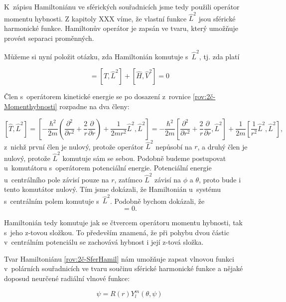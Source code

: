 K~zápisu Hamiltoniánu ve sférických souřadnicích jsme tedy použili operátor momentu hybnosti. {\color{red}Z kapitoly XXX} víme, že vlastní funkce $\hat{L}^2$ jsou sférické harmonické funkce. Hamiltonův operátor je zapsán ve tvaru, který umožňuje provést separaci proměnných. 


Můžeme si nyní položit otázku, zda Hamiltonián komutuje s~$\hat{L}^2$, tj. zda platí

\begin{equation}
[\hat{H},\hat{L}^{2}]=[\hat{T},\hat{L}^{2}]+[\hat{H},\hat{V}^{2}]=0   
\label{rov:2č-komutator}
\end{equation}

Člen s~operátorem kinetické energie se po dosazení z~rovnice \ref{rov:2č-Momenthybnosti} rozpadne na dva členy: 

\begin{equation}
\left[\hat{T},\hat{L}^{2}\right]=\left[-\frac{\hbar^{2}}{2m}\left(\frac{\partial^{2}}{\partial r^{2}}+\frac{2}{r}\frac{\partial}{\partial r}\right)+\frac{1}{2mr^{2}}\hat{L}^2,\hat{L}^2\right]=-\frac{\hbar^2}{2m}\left[\frac{\partial^{2}}{\partial r^{2}}+\frac{2}{r}\frac{\partial}{\partial r},\hat{L}^2\right]+\frac{1}{2m}\left[\frac{1}{r^2}\hat{L}^2,\hat{L}^2\right],
\label{rov:2č-komutatorT}
\end{equation}
z~nichž první člen je nulový, protože operátor $\hat{L}^{2}$ nepůsobí na  $ r $, a druhý člen je nulový, protože $ \hat{L}^2 $ komutuje sám se sebou. Podobně budeme postupovat u~komutátoru s~operátorem potenciální energie. Potenciální energie u~centrálního pole závisí pouze na $r$, zatímco $\hat{L}^2$ závisí na $ \phi $ a $ \theta $, proto bude i tento komutátor nulový.  Tím jsme dokázali, že Hamiltonián u~systému s~centrálním polem komutuje s~$\hat{L}^2$. Podobně bychom dokázali, že
\begin{equation}
[\hat{H},L_{z}]=0.
\end{equation}
 
Hamiltonián tedy komutuje jak se čtvercem operátoru momentu hybnosti, tak s~jeho z-tovou složkou. To především znamená, že při pohybu dvou částic v~centrálním potenciálu se zachovává hybnost i její z-tová složka. 


Tvar Hamiltoniánu \ref{rov:2č-SferHamil} nám umožňuje zapsat vlnovou funkci v~polárních souřadnicích ve tvaru součinu sférické harmonické funkce a nějaké doposud neurčené radiální vlnové funkce:

\begin{equation}
\psi=R(r)Y^m_l(\theta,\psi)
\end{equation}

